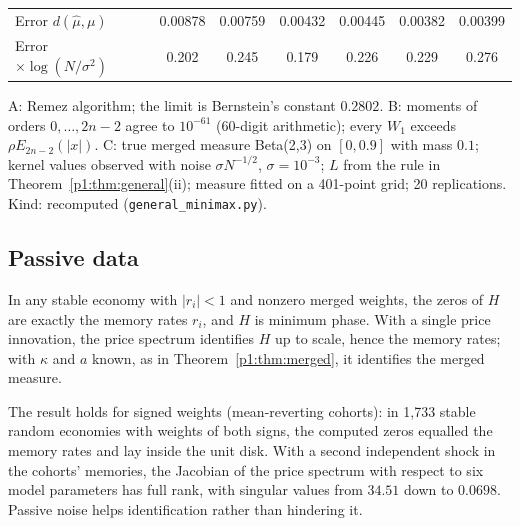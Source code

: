 \begin{table}[t]
\begin{threeparttable}
\begin{tabular}{lcccccc}
Error $d(\hat\mu,\mu)$ & 0.00878 & 0.00759 & 0.00432 & 0.00445 & 0.00382 & 0.00399\\
Error $\times\log(N/\sigma^2)$ & 0.202 & 0.245 & 0.179 & 0.226 & 0.229 & 0.276\\
\bottomrule
\end{tabular}
\begin{tablenotes}\footnotesize\item A: Remez algorithm; the limit is Bernstein's constant $0.2802$. B: moments of orders $0,\ldots,2n-2$ agree to $10^{-61}$ (60-digit arithmetic); every $W_1$ exceeds $\rho E_{2n-2}(|x|)$. C: true merged measure Beta(2,3) on $[0,0.9]$ with mass $0.1$; kernel values observed with noise $\sigma N^{-1/2}$, $\sigma=10^{-3}$; $L$ from the rule in Theorem~\ref{p1:thm:general}(ii); measure fitted on a 401-point grid; 20 replications. Kind: recomputed (\texttt{general\_minimax.py}).\end{tablenotes}
\end{threeparttable}
\end{table}

\subsection{Passive data}

\begin{theorem}\label{p1:thm:minphase}
In any stable economy with $|r_i|<1$ and nonzero merged weights, the zeros of $H$ are exactly the memory rates $r_i$, and $H$ is minimum phase. With a single price innovation, the price spectrum identifies $H$ up to scale, hence the memory rates; with $\kappa$ and $a$ known, as in Theorem~\ref{p1:thm:merged}, it identifies the merged measure.
\end{theorem}

The result holds for signed weights (mean-reverting cohorts): in 1,733 stable random economies with weights of both signs, the computed zeros equalled the memory rates and lay inside the unit disk. With a second independent shock in the cohorts' memories, the Jacobian of the price spectrum with respect to six model parameters has full rank, with singular values from $34.51$ down to $0.0698$. Passive noise helps identification rather than hindering it.

